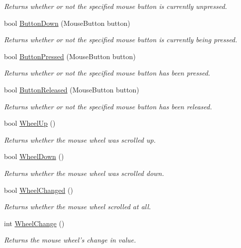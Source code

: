 \begin{DoxyCompactItemize}
\begin{DoxyCompactList}\small\item\em Returns whether or not the specified mouse button is currently unpressed. \end{DoxyCompactList}\item 
bool \hyperlink{class_tri_devs_1_1_tri_engine2_d_1_1_input_1_1_null_input_manager_ab38069ccd3245683457aeae4acef95f8}{Button\-Down} (Mouse\-Button button)
\begin{DoxyCompactList}\small\item\em Returns whether or not the specified mouse button is currently being pressed. \end{DoxyCompactList}\item 
bool \hyperlink{class_tri_devs_1_1_tri_engine2_d_1_1_input_1_1_null_input_manager_afe0386a599a114925b1eb5476f8a64c6}{Button\-Pressed} (Mouse\-Button button)
\begin{DoxyCompactList}\small\item\em Returns whether or not the specified mouse button has been pressed. \end{DoxyCompactList}\item 
bool \hyperlink{class_tri_devs_1_1_tri_engine2_d_1_1_input_1_1_null_input_manager_a827589d1117393e7748386b6416de482}{Button\-Released} (Mouse\-Button button)
\begin{DoxyCompactList}\small\item\em Returns whether or not the specified mouse button has been released. \end{DoxyCompactList}\item 
bool \hyperlink{class_tri_devs_1_1_tri_engine2_d_1_1_input_1_1_null_input_manager_a6ffebd26487cf6673e9b71808bfd2e56}{Wheel\-Up} ()
\begin{DoxyCompactList}\small\item\em Returns whether the mouse wheel was scrolled up. \end{DoxyCompactList}\item 
bool \hyperlink{class_tri_devs_1_1_tri_engine2_d_1_1_input_1_1_null_input_manager_a438af9fe186fdb91e3fe1e9fbb00a03f}{Wheel\-Down} ()
\begin{DoxyCompactList}\small\item\em Returns whether the mouse wheel was scrolled down. \end{DoxyCompactList}\item 
bool \hyperlink{class_tri_devs_1_1_tri_engine2_d_1_1_input_1_1_null_input_manager_afc5e4eb8cd98adc0ee1aea4a4967246a}{Wheel\-Changed} ()
\begin{DoxyCompactList}\small\item\em Returns whether the mouse wheel scrolled at all. \end{DoxyCompactList}\item 
int \hyperlink{class_tri_devs_1_1_tri_engine2_d_1_1_input_1_1_null_input_manager_a48b6584ca2a845d0ae108a0e08145c43}{Wheel\-Change} ()
\begin{DoxyCompactList}\small\item\em Returns the mouse wheel's change in value. \end{DoxyCompactList}\end{DoxyCompactItemize}
